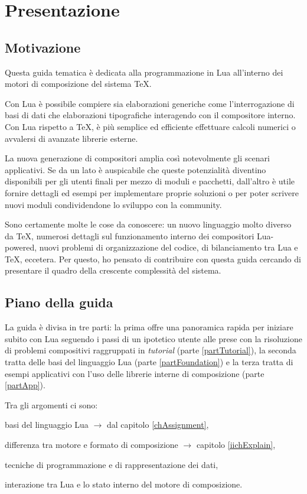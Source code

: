 

\chapter{Presentazione}

\section{Motivazione}

Questa guida tematica è dedicata alla programmazione in Lua all'interno dei
motori di composizione del sistema \TeX.

Con Lua è possibile compiere sia elaborazioni generiche come l'interrogazione di
basi di dati che elaborazioni tipografiche interagendo con il compositore
interno. Con Lua rispetto a \TeX, è più semplice ed efficiente effettuare
calcoli numerici o avvalersi di avanzate librerie esterne.

La nuova generazione di compositori amplia così notevolmente gli scenari
applicativi. Se da un lato è auspicabile che queste potenzialità diventino
disponibili per gli utenti finali per mezzo di moduli e pacchetti, dall'altro è
utile fornire dettagli ed esempi per implementare proprie soluzioni o per poter
scrivere nuovi moduli condividendone lo sviluppo con la community.

Sono certamente molte le cose da conoscere: un nuovo linguaggio molto diverso da
\TeX{}, numerosi dettagli sul funzionamento interno dei compositori Lua-powered,
nuovi problemi di organizzazione del codice, di bilanciamento tra Lua e \TeX,
eccetera. Per questo, ho pensato di contribuire con questa guida cercando di
presentare il quadro della crescente complessità del sistema.


\section{Piano della guida}

La guida è divisa in tre parti: la prima offre una panoramica rapida per
iniziare subito con Lua seguendo i passi di un ipotetico utente alle prese con
la risoluzione di problemi compositivi raggruppati in \emph{tutorial} (parte
\ref{partTutorial}), la seconda tratta delle basi del linguaggio Lua (parte
\ref{partFoundation}) e la terza tratta di esempi applicativi con l'uso delle
librerie interne di composizione (parte \ref{partApp}).

Tra gli argomenti ci sono:
\begin{compactitemize}
\item basi del linguaggio Lua \( \to \) dal capitolo \ref{chAssignment},
\item differenza tra motore e formato di composizione \( \to \) capitolo
\ref{iichExplain},
\item tecniche di programmazione e di rappresentazione dei dati,
\item interazione tra Lua e lo stato interno del motore di composizione.
\end{compactitemize}


